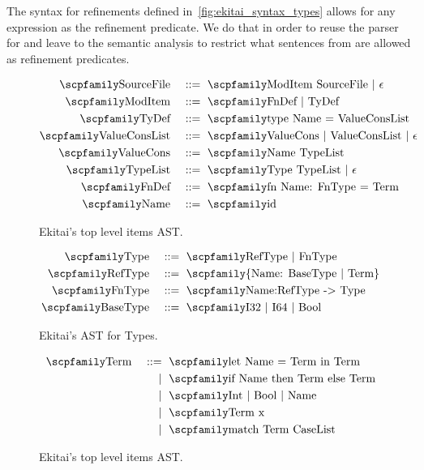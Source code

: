 \documentclass[
  oneside,
  english,
  coorientadorbanca,
  noabntexcite
]{ufsc-thesis-rn46-2019}
\def\bnfdef{::=}
\newcommand{\codett}[1]{\text{\scpfamily#1}}
\newcommand{\code}[1]{\text{\scpfamily\setlength\spaceskip{0.35em}#1}}
\newcommand{\bnfvar}[1]{\codett{#1}}
\newcommand{\bnfor}[1]{{$\mid$} #1}
\newcommand{\bnfmore}[1]{            & \ & \mid{}    & \ \code{#1}}
\newcommand{\astprod}[2]{\code{#1} & \ & \bnfdef{} & \ \code{#2}}
\newcommand{\astmore}[1]{\bnfmore{#1}}
\begin{document}
The syntax for refinements defined in~\cref{fig:ekitai_syntax_types} allows for any expression as the refinement predicate.
We do that in order to reuse the parser for \bnfvar{Expr} and leave to the semantic analysis to restrict what sentences from \bnfvar{Expr} are allowed as refinement predicates.

\begin{figure}[!htb]
  \begin{alignat*}{2}
    \astprod{SourceFile}{ModItem SourceFile \bnfor{$\epsilon$}}          \\
    \astprod{ModItem}{FnDef \bnfor{TyDef}}                               \\
    \astprod{TyDef}{type Name = ValueConsList}                           \\
    \astprod{ValueConsList}{ValueCons | ValueConsList \bnfor{$\epsilon$}} \\
    \astprod{ValueCons}{Name TypeList}                                  \\
    \astprod{TypeList}{Type TypeList \bnfor{$\epsilon$}}                \\
    \astprod{FnDef}{fn Name: FnType = Term}                     \\
    \astprod{Name}{id}
  \end{alignat*}
  \caption{Ekitai's top level items AST.}
\end{figure}

\begin{figure}[!htb]
  \begin{alignat*}{2}
    \astprod{Type}{RefType \bnfor{FnType}} \\
    \astprod{RefType}{\{Name: BaseType | Term\}} \\
    \astprod{FnType}{Name:RefType -> Type} \\
    \astprod{BaseType}{I32 \bnfor{I64} \bnfor{Bool}}
  \end{alignat*}
  \caption{Ekitai's AST for Types.}
\end{figure}

\begin{figure}[!htb]
  \begin{alignat*}{2}
    \astprod{Term}{let Name = Term in Term} \\
    \astmore{if Name then Term else Term}   \\
    \astmore{Int \bnfor{Bool} \bnfor{Name}} \\
    \astmore{Term x} \\
    \astmore{match Term CaseList}
  \end{alignat*}
  \caption{Ekitai's top level items AST.}
\end{figure}
\end{document}
